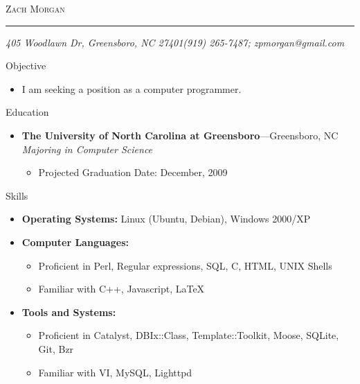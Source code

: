 \documentclass[11pt,oneside]{article}
\makeatletter
\newcommand{\name}{Zach Morgan}
\newcommand{\addr}{405 Woodlawn Dr, Greensboro, NC 27401}
\newcommand{\phone}{(919) 265-7487}
\newcommand{\email}{zpmorgan@gmail.com}
\newcommand{\bigname}[1]{
	\begin{center}\fontfamily{phv}\selectfont\Huge\scshape#1\end{center}
}
\newenvironment{ressection}[1]{
	\vspace{4pt}
	{\fontfamily{phv}\selectfont\Large#1}
	\begin{itemize}
	\vspace{3pt}
}{
	\end{itemize}
}
\newcommand{\resitem}[1]{
	\vspace{-4pt}
	\item \begin{flushleft} #1 \end{flushleft}
}
\newcommand{\ressubitem}[1]{
	\vspace{-1pt}
	\item \begin{flushleft} #1 \end{flushleft}
}
\newcommand{\resbigitem}[3]{
	\vspace{-5pt}
	\item
	\textbf{#1}---#2 \\
	\textit{#3}
}
\newenvironment{ressubsec}[3]{
	\resbigitem{#1}{#2}{#3}
	\vspace{-2pt}
	\begin{itemize}
}{
	\end{itemize}
}
\newenvironment{reslist}[1]{
	\resitem{\textbf{#1}}
	\vspace{-5pt}
	\begin{itemize}
}{
	\end{itemize}
}
\makeatother
\begin{document}
 \selectfont

\bigname{\name}

\vspace{-8pt} \rule{\textwidth}{1pt}

\vspace{-1pt} {\small\itshape \addr \hfill \phone; \email}

\vspace{8 pt}




\begin{ressection}{Objective}

   \resitem{I am seeking a position as a computer programmer.}
	
\end{ressection}


\begin{ressection}{Education}

	\begin{ressubsec}{The University of North Carolina at Greensboro}{Greensboro, NC}{Majoring in Computer Science}
		\ressubitem{Projected Graduation Date: December, 2009}
	\end{ressubsec}

\end{ressection}


\begin{ressection}{Skills}

	\resitem{\textbf{Operating Systems:} Linux (Ubuntu, Debian), Windows 2000/XP}

	\begin{reslist}{Computer Languages:}

		\ressubitem{Proficient in Perl, Regular expressions, SQL, C, HTML, UNIX Shells}

		\ressubitem{Familiar with C++, Javascript, \LaTeX}

	\end{reslist}

	\begin{reslist}{Tools and Systems:}

		\ressubitem{Proficient in Catalyst, DBIx::Class, Template::Toolkit, Moose, SQLite, Git, Bzr}

		\ressubitem{Familiar with VI, MySQL, Lighttpd}

	\end{reslist}


\end{ressection}
\end{document}
